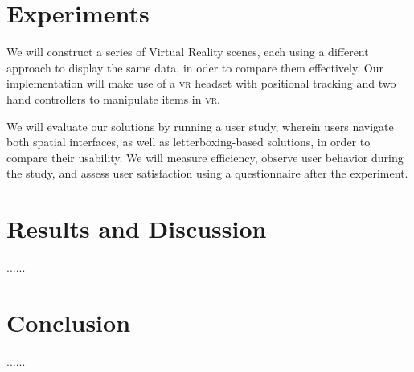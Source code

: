 \documentclass{tufte-book} %
\begin{document}

\chapter{Experiments}
\label{ch:experiments}

We will construct a series of Virtual Reality scenes, each using a different approach to display the same data, in oder to compare them effectively. Our implementation will make use of a \textsc{vr} headset with positional tracking and two hand controllers to manipulate items in \textsc{vr}.

We will evaluate our solutions by running a user study, wherein users navigate both spatial interfaces, as well as letterboxing-based solutions, in order to compare their usability. We will measure efficiency, observe user behavior during the study, and assess user satisfaction using a questionnaire after the experiment.



\chapter{Results and Discussion}
\label{ch:results-and-discussion}


......


\chapter{Conclusion}
\label{ch:conclusion}


......


\backmatter




\printindex %
\end{document}
